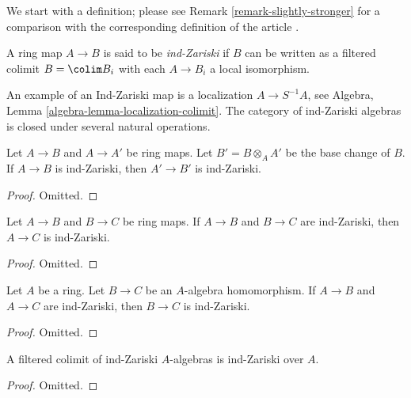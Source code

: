 \noindent
We start with a definition; please see Remark \ref{remark-slightly-stronger}
for a comparison with the corresponding definition of the article \cite{BS}.

\begin{definition}
\label{definition-ind-zariski}
A ring map $A \to B$ is said to be {\it ind-Zariski} if $B$ can be written
as a filtered colimit $B = \colim B_i$ with each $A \to B_i$ a local
isomorphism.
\end{definition}

\noindent
An example of an Ind-Zariski map is a localization $A \to S^{-1}A$, see
Algebra, Lemma \ref{algebra-lemma-localization-colimit}.
The category of ind-Zariski algebras is closed under several natural
operations.

\begin{lemma}
\label{lemma-base-change-ind-zariski}
Let $A \to B$ and $A \to A'$ be ring maps. Let $B' = B \otimes_A A'$
be the base change of $B$.
If $A \to B$ is ind-Zariski, then $A' \to B'$ is ind-Zariski.
\end{lemma}

\begin{proof}
Omitted.
\end{proof}

\begin{lemma}
\label{lemma-composition-ind-zariski}
Let $A \to B$ and $B \to C$ be ring maps. If $A \to B$ and $B \to C$
are ind-Zariski, then $A \to C$ is ind-Zariski.
\end{lemma}

\begin{proof}
Omitted.
\end{proof}

\begin{lemma}
\label{lemma-ind-zariski-permanence}
Let $A$ be a ring. Let $B \to C$ be an $A$-algebra homomorphism.
If $A \to B$ and $A \to C$ are ind-Zariski, then $B \to C$
is ind-Zariski.
\end{lemma}

\begin{proof}
Omitted.
\end{proof}

\begin{lemma}
\label{lemma-ind-ind-zariski}
A filtered colimit of ind-Zariski $A$-algebras is ind-Zariski over $A$.
\end{lemma}

\begin{proof}
Omitted.
\end{proof}

